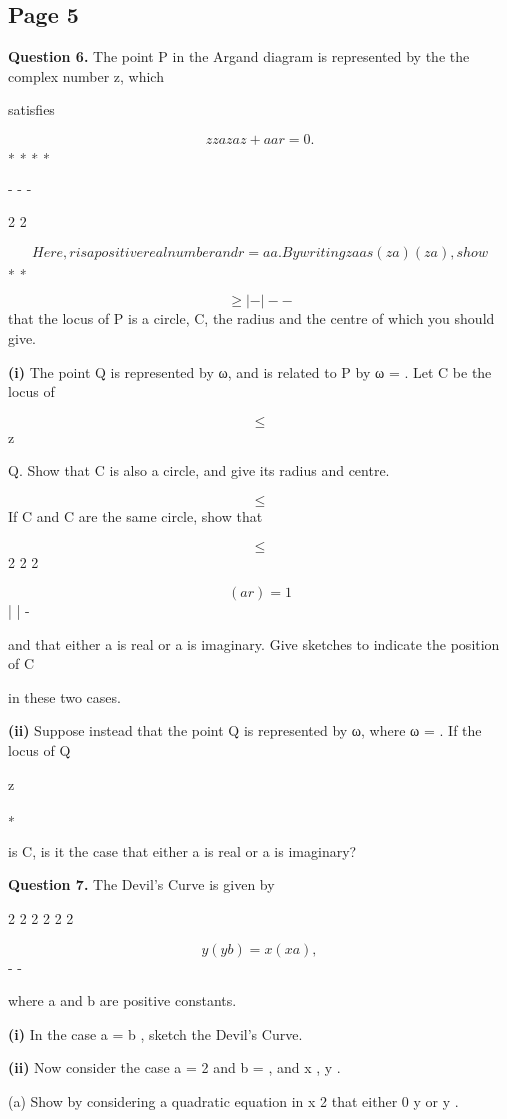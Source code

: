 \documentclass[12pt]{article}
\begin{document}
\subsection*{Page 5}
\begin{flushleft}
\bigskip\textbf{Question 6.} The point P in the Argand diagram is represented by the the complex number z, which\par
satisfies\par
\[zz az a z + aa r = 0.\]
∗ ∗ ∗ ∗\par
- - -\par
2 2\par
\[Here, r is a positive real number and r = a a. By writing z a as (z a)(z a) , show\]
∗ ∗\par
\[\geq | - | - -\]
that the locus of P is a circle, C, the radius and the centre of which you should give.\par
\textbf{(i)} The point Q is represented by ω, and is related to P by ω = . Let C be the locus of\par
\[\leq\]
z\par
Q. Show that C is also a circle, and give its radius and centre.\par
\[\leq\]
If C and C are the same circle, show that\par
\[\leq\]
2 2 2\par
\[( a r ) = 1\]
| | -\par
and that either a is real or a is imaginary. Give sketches to indicate the position of C\par
in these two cases.\par
\textbf{(ii)} Suppose instead that the point Q is represented by ω, where ω = . If the locus of Q\par
z\par
∗\par
is C, is it the case that either a is real or a is imaginary?\par
\bigskip\textbf{Question 7.} The Devil's Curve is given by\par
2 2 2 2 2 2\par
\[y (y b ) = x (x a ) ,\]
- -\par
where a and b are positive constants.\par
\textbf{(i)} In the case a = b , sketch the Devil's Curve.\par
\textbf{(ii)} Now consider the case a = 2 and b = , and x , y .\par
(a) Show by considering a quadratic equation in x 2 that either 0 \geq y  or y  .\par

\end{flushleft}
\end{document}
